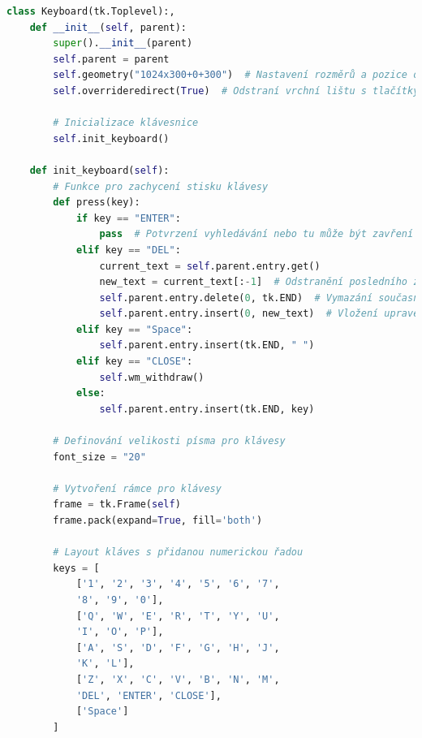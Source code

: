 \begin{lstlisting}[language=Python, caption=Hlavní okno, frame=single]
class Keyboard(tk.Toplevel):,
    def __init__(self, parent):
        super().__init__(parent)
        self.parent = parent
        self.geometry("1024x300+0+300")  # Nastavení rozměrů a pozice okna na spodní polovinu obrazovky
        self.overrideredirect(True)  # Odstraní vrchní lištu s tlačítky minimalizace, maximalizace a zavření

        # Inicializace klávesnice
        self.init_keyboard()

    def init_keyboard(self):
        # Funkce pro zachycení stisku klávesy
        def press(key):
            if key == "ENTER":
                pass  # Potvrzení vyhledávání nebo tu může být zavření klávesnice...uvidím
            elif key == "DEL":
                current_text = self.parent.entry.get()
                new_text = current_text[:-1]  # Odstranění posledního znaku
                self.parent.entry.delete(0, tk.END)  # Vymazání současného textu
                self.parent.entry.insert(0, new_text)  # Vložení upraveného textu
            elif key == "Space":
                self.parent.entry.insert(tk.END, " ")
            elif key == "CLOSE":
                self.wm_withdraw()
            else:
                self.parent.entry.insert(tk.END, key)

        # Definování velikosti písma pro klávesy
        font_size = "20"

        # Vytvoření rámce pro klávesy
        frame = tk.Frame(self)
        frame.pack(expand=True, fill='both')

        # Layout kláves s přidanou numerickou řadou
        keys = [
            ['1', '2', '3', '4', '5', '6', '7', 
            '8', '9', '0'],
            ['Q', 'W', 'E', 'R', 'T', 'Y', 'U', 
            'I', 'O', 'P'],
            ['A', 'S', 'D', 'F', 'G', 'H', 'J', 
            'K', 'L'],
            ['Z', 'X', 'C', 'V', 'B', 'N', 'M', 
            'DEL', 'ENTER', 'CLOSE'],
            ['Space']
        ]


\end{lstlisting}

